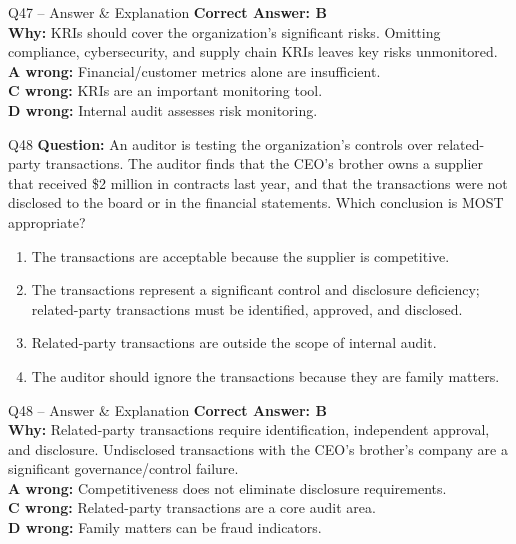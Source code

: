 \documentclass[aspectratio=169,10pt]{beamer}
\begin{document}
	\begin{frame}[t]{Q47 -- Answer \& Explanation}
		\small
		\textbf{Correct Answer: B} \\[4pt]
		\textbf{Why:} KRIs should cover the organization's significant risks. Omitting compliance, cybersecurity, and supply chain KRIs leaves key risks unmonitored. \\[4pt]
		\textbf{A wrong:} Financial/customer metrics alone are insufficient. \\[2pt]
		\textbf{C wrong:} KRIs are an important monitoring tool. \\[2pt]
		\textbf{D wrong:} Internal audit assesses risk monitoring.
	\end{frame}
	
	\begin{frame}[t]{Q48}
		\small
		\textbf{Question:} An auditor is testing the organization's controls over related-party transactions. The auditor finds that the CEO's brother owns a supplier that received \$2 million in contracts last year, and that the transactions were not disclosed to the board or in the financial statements. Which conclusion is MOST appropriate?
		\begin{enumerate}[label=\Alph*.,itemsep=1pt,topsep=2pt]
			\item The transactions are acceptable because the supplier is competitive.
			\item The transactions represent a significant control and disclosure deficiency; related-party transactions must be identified, approved, and disclosed.
			\item Related-party transactions are outside the scope of internal audit.
			\item The auditor should ignore the transactions because they are family matters.
		\end{enumerate}
	\end{frame}
	
	\begin{frame}[t]{Q48 -- Answer \& Explanation}
		\small
		\textbf{Correct Answer: B} \\[4pt]
		\textbf{Why:} Related-party transactions require identification, independent approval, and disclosure. Undisclosed transactions with the CEO's brother's company are a significant governance/control failure. \\[4pt]
		\textbf{A wrong:} Competitiveness does not eliminate disclosure requirements. \\[2pt]
		\textbf{C wrong:} Related-party transactions are a core audit area. \\[2pt]
		\textbf{D wrong:} Family matters can be fraud indicators.
	\end{frame}
	
\end{document}
